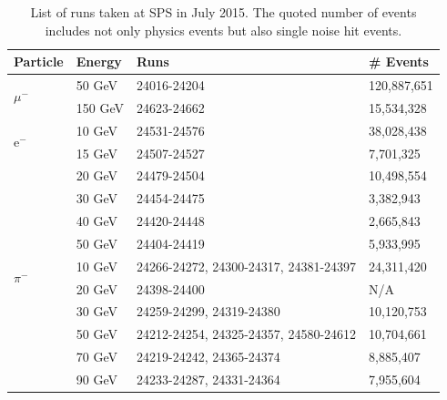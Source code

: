 \documentclass{JINST}
\begin{document}
\begin{table}[htb!]
  \centering
  \caption{List of runs taken at SPS in July 2015. The quoted number of events includes not only physics events but also single noise hit events.}
  \label{table:dataruns}
  \begin{tabular}{@{}lp{2cm}p{7.5cm}p{2cm}@{}}
    \toprule
    \multicolumn{1}{l}{\textbf{Particle}} & \textbf{Energy} & \textbf{Runs} & \textbf{\# Events}\\
    \midrule
    \multirow{2}{*}{$\mu^-$}& 50 GeV & 24016-24204 & 120,887,651\\& 150 GeV & 24623-24662 & 15,534,328\\
    \midrule
    \multirow{2}{*}{e$^-$}& 10 GeV & 24531-24576 & 38,028,438\\& 15 GeV & 24507-24527 & 7,701,325\\& 20 GeV & 24479-24504 & 10,498,554\\& 30 GeV & 24454-24475 & 3,382,943\\& 40 GeV & 24420-24448 & 2,665,843\\& 50 GeV & 24404-24419 & 5,933,995\\
    \midrule
    \multirow{2}{*}{$\pi^-$}& 10 GeV & 24266-24272, 24300-24317, 24381-24397 & 24,311,420\\& 20 GeV & 24398-24400 & N/A\footnotemark\\& 30 GeV & 24259-24299, 24319-24380 & 10,120,753\\& 50 GeV & 24212-24254, 24325-24357, 24580-24612 & 10,704,661\\& 70 GeV & 24219-24242, 24365-24374 & 8,885,407\\& 90 GeV & 24233-24287, 24331-24364 & 7,955,604\\
    \bottomrule
  \end{tabular}
\end{table}
\end{document}
